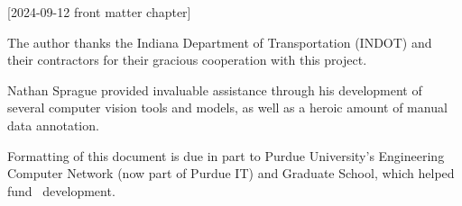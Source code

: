 [2024-09-12 front matter chapter]
%
%
%
%
%
%

%
%
%
\begin{statement}
\end{statement}


\begin{acknowledgments}
  The author thanks the Indiana Department of Transportation (INDOT) and their contractors for their gracious cooperation with this project.

  Nathan Sprague provided invaluable assistance through his development of several computer vision tools and models, as well as a heroic amount of manual data annotation.
  
  Formatting of this document is due in part to Purdue University's Engineering Computer Network (now part of Purdue IT) and Graduate School, which helped fund \PurdueThesisLogo\ development.
\end{acknowledgments}

